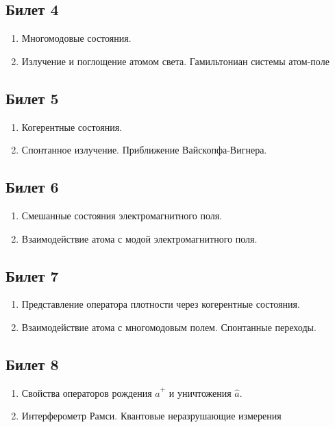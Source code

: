 \documentclass[12pt,a4paper]{article}
\begin{document}
\subsection*{Билет 4} 
\begin{enumerate}
\item Многомодовые состояния. 
\item Излучение и поглощение атомом света. 
Гамильтониан системы атом-поле
\end{enumerate}

\subsection*{Билет 5} 
\begin{enumerate}
\item Когерентные состояния. 
\item Спонтанное излучение. Приближение Вайскопфа-Вигнера.
\end{enumerate}

\subsection*{Билет 6} 
\begin{enumerate}
\item Смешанные состояния электромагнитного поля. 
\item Взаимодействие
атома с модой электромагнитного поля. 
\end{enumerate}

\subsection*{Билет 7} 
\begin{enumerate}
\item Представление оператора плотности через когерентные
  состояния.
\item Взаимодействие атома с многомодовым полем. Спонтанные переходы.
\end{enumerate}

\subsection*{Билет 8} 
\begin{enumerate}
\item Свойства операторов рождения $\hat{a}^+$ и уничтожения $\hat{a}$.
\item Интерферометр Рамси. Квантовые неразрушающие измерения
\end{enumerate}
\end{document}
